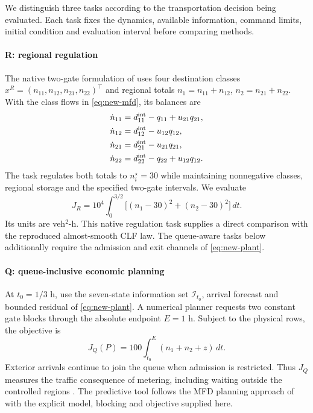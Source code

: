 \documentclass[preprint,12pt]{elsarticle}
\begin{document}
We distinguish three tasks according to the transportation decision being
evaluated. Each task fixes the dynamics, available information, command limits,
initial condition and evaluation interval before comparing methods.

\paragraph{R: regional regulation}
The native two-gate formulation of \cite{zhong2018robust} uses four
destination classes $x^R=(n_{11},n_{12},n_{21},n_{22})^\top$ and regional
totals $n_1=n_{11}+n_{12}$, $n_2=n_{21}+n_{22}$. With the class flows in
\eqref{eq:new-mfd}, its balances are
\begin{equation}
\begin{aligned}
\dot n_{11}&=d^{\rm int}_{11}-q_{11}+u_{21}q_{21},\\
\dot n_{12}&=d^{\rm int}_{12}-u_{12}q_{12},\\
\dot n_{21}&=d^{\rm int}_{21}-u_{21}q_{21},\\
\dot n_{22}&=d^{\rm int}_{22}-q_{22}+u_{12}q_{12}.
\end{aligned}
\label{eq:benchmark-native}
\end{equation}
The task regulates both totals to $n_i^\star=30$ while maintaining
nonnegative classes, regional storage and the specified two-gate intervals.
We evaluate
\begin{equation}
J_R=10^4\int_0^{3/2}\bigl[(n_1-30)^2+(n_2-30)^2\bigr]\,dt.
\label{eq:benchmark-regulation-cost}
\end{equation}
Its units are veh$^2$-h. This native regulation task supplies a direct
comparison with the reproduced almost-smooth CLF law. The queue-aware tasks
below additionally require the admission and exit channels of
\eqref{eq:new-plant}.

\paragraph{Q: queue-inclusive economic planning}
At $t_0=1/3$ h, use the seven-state information set $\mathcal I_{t_0}$,
arrival forecast and bounded residual of \eqref{eq:new-plant}. A numerical
planner requests two constant gate blocks through the absolute endpoint
$E=1$ h. Subject to the physical rows, the objective is
\begin{equation}
J_Q(P)=100\int_{t_0}^{E}(n_1+n_2+z)\,dt.
\label{eq:benchmark-queue-cost}
\end{equation}
Exterior arrivals continue to join the queue when admission is restricted.
Thus $J_Q$ measures the traffic consequence of metering, including waiting
outside the controlled regions \cite{haddad2017queues}. The predictive tool
follows the MFD planning approach of \cite{geroliminis2013mpc} with the
explicit model, blocking and objective supplied here.
\end{document}
